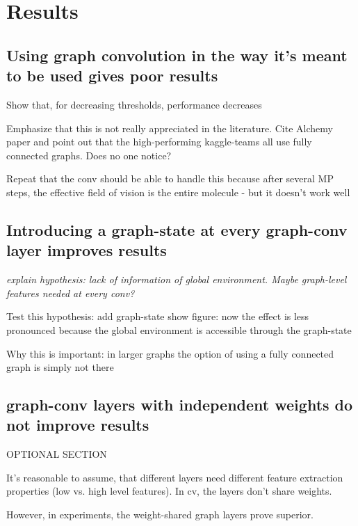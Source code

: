\chapter{Results}
\label{chapter:Results}

\section{Using graph convolution in the way it's meant to be used gives poor results}

{\itshape

Show that, for decreasing thresholds, performance decreases

Emphasize that this is not really appreciated in the literature.
Cite Alchemy paper and point out that the high-performing kaggle-teams all use fully connected graphs.
Does no one notice?

Repeat that the conv should be able to handle this because after several MP steps, the effective field of vision is the entire molecule - but it doesn't work well


}

\section{Introducing a graph-state at every graph-conv layer improves results}



{\itshape
explain hypothesis:
lack of information of global environment. Maybe graph-level features needed at every conv?

Test this hypothesis:
add graph-state
show figure: now the effect is less pronounced because the global environment is accessible through the graph-state

Why this is important:
in larger graphs the option of using a fully connected graph is simply not there

}


\section{graph-conv layers with independent weights do not improve results}

{\itshape
	
OPTIONAL SECTION

It's reasonable to assume, that different layers need different feature extraction properties (low vs. high level features). In cv, the layers don't share weights.

However, in experiments, the weight-shared graph layers prove superior.
}

